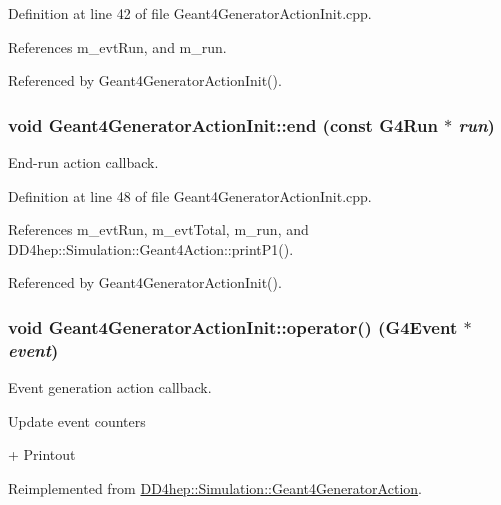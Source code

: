 Definition at line 42 of file Geant4GeneratorActionInit.cpp.

References m\_\-evtRun, and m\_\-run.

Referenced by Geant4GeneratorActionInit().\hypertarget{class_d_d4hep_1_1_simulation_1_1_geant4_generator_action_init_aa3b0b224ed839f32af03507be13267a8}{
\subsubsection[{end}]{\setlength{\rightskip}{0pt plus 5cm}void Geant4GeneratorActionInit::end (const G4Run $\ast$ {\em run})}}
\label{class_d_d4hep_1_1_simulation_1_1_geant4_generator_action_init_aa3b0b224ed839f32af03507be13267a8}


End-\/run action callback. 

Definition at line 48 of file Geant4GeneratorActionInit.cpp.

References m\_\-evtRun, m\_\-evtTotal, m\_\-run, and DD4hep::Simulation::Geant4Action::printP1().

Referenced by Geant4GeneratorActionInit().\hypertarget{class_d_d4hep_1_1_simulation_1_1_geant4_generator_action_init_adbcf087dfc4c0ac510b102dfd1f838b0}{
\subsubsection[{operator()}]{\setlength{\rightskip}{0pt plus 5cm}void Geant4GeneratorActionInit::operator() (G4Event $\ast$ {\em event})}}
\label{class_d_d4hep_1_1_simulation_1_1_geant4_generator_action_init_adbcf087dfc4c0ac510b102dfd1f838b0}


Event generation action callback. 

Update event counters

+ Printout 

Reimplemented from \hyperlink{class_d_d4hep_1_1_simulation_1_1_geant4_generator_action_ac5a1d2335a19e3f9d555081199e01801}{DD4hep::Simulation::Geant4GeneratorAction}.

